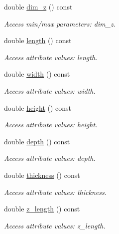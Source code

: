 \begin{DoxyCompactItemize}
double \hyperlink{struct_d_d4hep_1_1_x_m_l_1_1_child_value_a033a01f29a643501c779739e09810c60}{dim\+\_\+z} () const
\begin{DoxyCompactList}\small\item\em Access min/max parameters\+: dim\+\_\+z. \end{DoxyCompactList}\item 
double \hyperlink{struct_d_d4hep_1_1_x_m_l_1_1_child_value_af93150734222dded0b8d8cc72e5cbc68}{length} () const
\begin{DoxyCompactList}\small\item\em Access attribute values\+: length. \end{DoxyCompactList}\item 
double \hyperlink{struct_d_d4hep_1_1_x_m_l_1_1_child_value_a7db2e09a32bef20445f2267314bb8c08}{width} () const
\begin{DoxyCompactList}\small\item\em Access attribute values\+: width. \end{DoxyCompactList}\item 
double \hyperlink{struct_d_d4hep_1_1_x_m_l_1_1_child_value_ac54e21cc5e8c93f02bea44cc97b91c24}{height} () const
\begin{DoxyCompactList}\small\item\em Access attribute values\+: height. \end{DoxyCompactList}\item 
double \hyperlink{struct_d_d4hep_1_1_x_m_l_1_1_child_value_a8ca412dee3914fc77e342e70a0ba89d6}{depth} () const
\begin{DoxyCompactList}\small\item\em Access attribute values\+: depth. \end{DoxyCompactList}\item 
double \hyperlink{struct_d_d4hep_1_1_x_m_l_1_1_child_value_ae5401e6e0d8f102da67bedaee42818b9}{thickness} () const
\begin{DoxyCompactList}\small\item\em Access attribute values\+: thickness. \end{DoxyCompactList}\item 
double \hyperlink{struct_d_d4hep_1_1_x_m_l_1_1_child_value_ac3459bdc15d13dd5bc6248eed6eb6af7}{z\+\_\+length} () const
\begin{DoxyCompactList}\small\item\em Access attribute values\+: z\+\_\+length. \end{DoxyCompactList}\item 

\end{DoxyCompactItemize}
